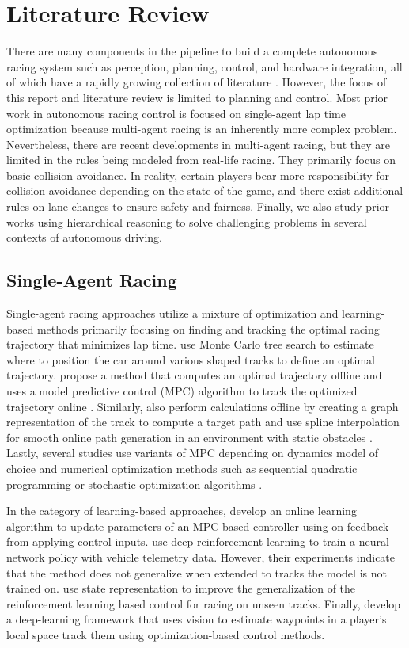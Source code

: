 \chapter{Literature Review} \label{chapter:litreview}
There are many components in the pipeline to build a complete autonomous racing system such as perception, planning, control, and hardware integration, all of which have a rapidly growing collection of literature \cite{litreview}. However, the focus of this report and literature review is limited to planning and control. Most prior work in autonomous racing control is focused on single-agent lap time optimization because multi-agent racing is an inherently more complex problem. Nevertheless, there are recent developments in multi-agent racing, but they are limited in the rules being modeled from real-life racing. They primarily focus on basic collision avoidance. In reality, certain players bear more responsibility for collision avoidance depending on the state of the game, and there exist additional rules on lane changes to ensure safety and fairness. Finally, we also study prior works using hierarchical reasoning to solve challenging problems in several contexts of autonomous driving. 

\section{Single-Agent Racing} 
Single-agent racing approaches utilize a mixture of optimization and learning-based methods primarily focusing on finding and tracking the optimal racing trajectory that minimizes lap time. \citet{Hou2016} use Monte Carlo tree search to estimate where to position the car around various shaped tracks to define an optimal trajectory. \citet{Vazquez2020} propose a method that computes an optimal trajectory offline and uses a model predictive control (MPC) algorithm to track the optimized trajectory online . Similarly, \citet{Stahl2019_2} also perform calculations offline by creating a graph representation of the track to compute a target path and use spline interpolation for smooth online path generation in an environment with static obstacles . Lastly, several studies use variants of MPC depending on dynamics model of choice and numerical optimization methods such as sequential quadratic programming or stochastic optimization algorithms \cite{Liniger2014, Anderson2016, Kalaria2021, Kloeser2020,OKelly2020}.  

In the category of learning-based approaches, \citet{Kabzan2019} develop an online learning algorithm to update parameters of an MPC-based controller using on feedback from applying control inputs. \citet{Remonda2021} use deep reinforcement learning to train a neural network policy with vehicle telemetry data. However, their experiments indicate that the method does not generalize when extended to tracks the model is not trained on. \citet{deBruin2018} use state representation to improve the generalization of the reinforcement learning based control for racing on unseen tracks. Finally, \citet{weiss2020} develop a deep-learning framework that uses vision to estimate waypoints in a player's local space track them using optimization-based control methods.

